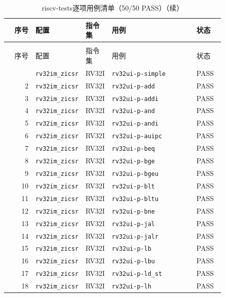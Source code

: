 \begin{reporttable}
\begin{longtable}{@{}r p{0.22\linewidth}p{0.12\linewidth}p{0.39\linewidth}p{0.13\linewidth}@{}}
\caption{riscv-tests逐项用例清单（50/50 PASS）}\label{tbl:cpu-riscv-tests-cases}\\
\toprule
序号 & 配置 & 指令集 & 用例 & 状态 \\
\midrule
\endfirsthead
\caption[]{riscv-tests逐项用例清单（50/50 PASS）（续）}\\
\toprule
序号 & 配置 & 指令集 & 用例 & 状态 \\
\midrule
\endhead
\bottomrule
\endfoot
1 & \texttt{rv32im\_zicsr} & RV32I & \texttt{rv32ui-p-simple} & PASS \\
2 & \texttt{rv32im\_zicsr} & RV32I & \texttt{rv32ui-p-add} & PASS \\
3 & \texttt{rv32im\_zicsr} & RV32I & \texttt{rv32ui-p-addi} & PASS \\
4 & \texttt{rv32im\_zicsr} & RV32I & \texttt{rv32ui-p-and} & PASS \\
5 & \texttt{rv32im\_zicsr} & RV32I & \texttt{rv32ui-p-andi} & PASS \\
6 & \texttt{rv32im\_zicsr} & RV32I & \texttt{rv32ui-p-auipc} & PASS \\
7 & \texttt{rv32im\_zicsr} & RV32I & \texttt{rv32ui-p-beq} & PASS \\
8 & \texttt{rv32im\_zicsr} & RV32I & \texttt{rv32ui-p-bge} & PASS \\
9 & \texttt{rv32im\_zicsr} & RV32I & \texttt{rv32ui-p-bgeu} & PASS \\
10 & \texttt{rv32im\_zicsr} & RV32I & \texttt{rv32ui-p-blt} & PASS \\
11 & \texttt{rv32im\_zicsr} & RV32I & \texttt{rv32ui-p-bltu} & PASS \\
12 & \texttt{rv32im\_zicsr} & RV32I & \texttt{rv32ui-p-bne} & PASS \\
13 & \texttt{rv32im\_zicsr} & RV32I & \texttt{rv32ui-p-jal} & PASS \\
14 & \texttt{rv32im\_zicsr} & RV32I & \texttt{rv32ui-p-jalr} & PASS \\
15 & \texttt{rv32im\_zicsr} & RV32I & \texttt{rv32ui-p-lb} & PASS \\
16 & \texttt{rv32im\_zicsr} & RV32I & \texttt{rv32ui-p-lbu} & PASS \\
17 & \texttt{rv32im\_zicsr} & RV32I & \texttt{rv32ui-p-ld\_st} & PASS \\
18 & \texttt{rv32im\_zicsr} & RV32I & \texttt{rv32ui-p-lh} & PASS \\

\end{longtable}
\end{reporttable}
